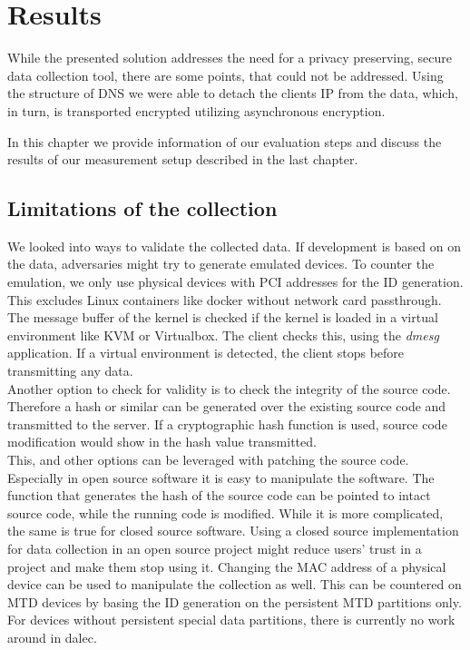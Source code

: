 \chapter{Results}
\label{chap:results}

While the presented solution addresses the need for a privacy preserving, secure data collection tool, there are some points, that could not be addressed. 
Using the structure of DNS we were able to detach the clients IP from the data, which, in turn, is transported encrypted utilizing asynchronous encryption. 

In this chapter we provide information of our evaluation steps and discuss the results of our measurement setup described in the last chapter.\\

\section{Limitations of the collection}
\label{sec:measurement:robust}
%

    We looked into ways to validate the collected data. If development is based on on the data, adversaries might try to generate emulated devices. To counter the emulation, we only use physical devices with PCI addresses for the ID generation. This excludes Linux containers like docker without network card passthrough. The message buffer of the kernel is checked if the kernel is loaded in a virtual environment like KVM or Virtualbox. The client checks this, using the \textit{dmesg} application. 
    If a virtual environment is detected, the client stops before transmitting any data.\\
    
    Another option to check for validity is to check the integrity of the source code. Therefore a hash or similar can be generated over the existing source code and transmitted to the server.
    If a cryptographic hash function is used, source code modification would show in the hash value transmitted.\\
    This, and other options can be leveraged with patching the source code. Especially in open source software it is easy to manipulate the software. The function that generates the hash of the source code can be pointed to intact source code, while the running code is modified. While it is more complicated, the same is true for closed source software.
    Using a closed source implementation for data collection in an open source project might reduce users' trust in a project and make them stop using it.
    Changing the MAC address of a physical device can be used to manipulate the collection as well. This can be countered on MTD devices by basing the ID generation on the persistent MTD partitions only. For devices without persistent special data partitions, there is currently no work around in dalec.\\
    
